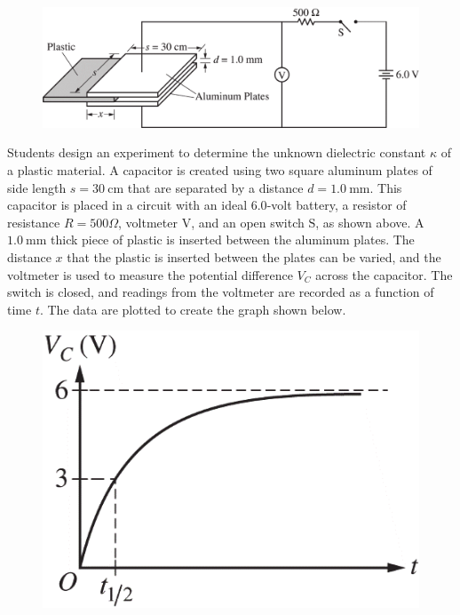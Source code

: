 %
\begin{figure}[H]
\centering
\includegraphics[scale=0.3]{images/img-018-032.png}
\end{figure}

\question
Students design an experiment to determine the unknown dielectric constant $\kappa$ of a plastic material. A capacitor is created using two square aluminum plates of side length $s=30 \mathrm{~cm}$ that are separated by a distance $d=1.0 \mathrm{~mm}$. This capacitor is placed in a circuit with an ideal $6.0$-volt battery, a resistor of resistance $R=500 \Omega$, voltmeter $\mathrm{V}$, and an open switch $\mathrm{S}$, as shown above. A $1.0 \mathrm{~mm}$ thick piece of plastic is inserted between the aluminum plates. The distance $x$ that the plastic is inserted between the plates can be varied, and the voltmeter is used to measure the potential difference $V_{C}$ across the capacitor. The switch is closed, and readings from the voltmeter are recorded as a function of time $t$. The data are plotted to create the graph shown below. %

\begin{figure}[H]
\centering
\includegraphics[scale=0.3]{images/img-018-033.png}
\end{figure}

